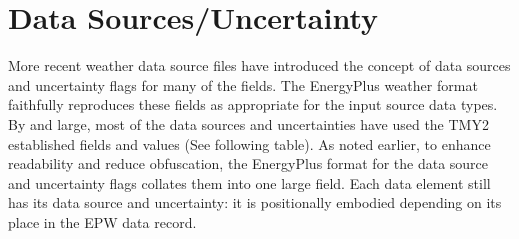 \section{Data Sources/Uncertainty}\label{data-sourcesuncertainty}

More recent weather data source files have introduced the concept of data sources and uncertainty flags for many of the fields. The EnergyPlus weather format faithfully reproduces these fields as appropriate for the input source data types. By and large, most of the data sources and uncertainties have used the TMY2 established fields and values (See following table). As noted earlier, to enhance readability and reduce obfuscation, the EnergyPlus format for the data source and uncertainty flags collates them into one large field. Each data element still has its data source and uncertainty: it is positionally embodied depending on its place in the EPW data record.

